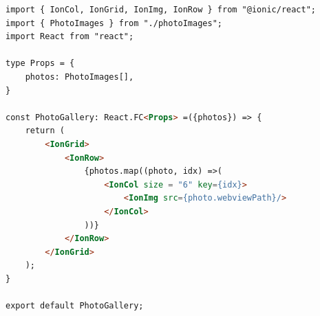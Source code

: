 \begin{lstlisting}[language=HTML, caption=Kode dari photoGallery.tsx, label=kode:photo-gallery-tsx]
import { IonCol, IonGrid, IonImg, IonRow } from "@ionic/react";
import { PhotoImages } from "./photoImages";
import React from "react";

type Props = {
    photos: PhotoImages[],
}

const PhotoGallery: React.FC<Props> =({photos}) => {
    return (
        <IonGrid>
            <IonRow>
                {photos.map((photo, idx) =>(
                    <IonCol size = "6" key={idx}>
                        <IonImg src={photo.webviewPath}/>
                    </IonCol>
                ))}
            </IonRow>
        </IonGrid>
    );
}

export default PhotoGallery;
\end{lstlisting}